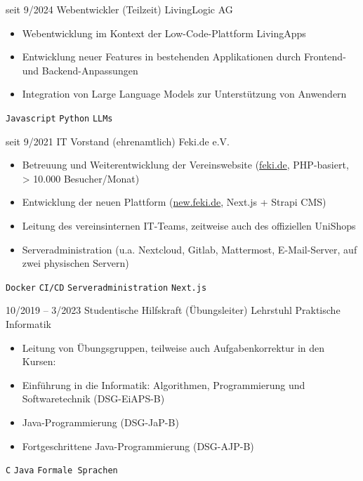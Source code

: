 \documentclass[9pt]{developercv} %
\begin{document}
\begin{entrylist}
	\entry
	{seit 9/2024}
	{Webentwickler (Teilzeit)}
	{LivingLogic AG}
	{\vspace{-10pt}
		\begin{itemize}[noitemsep,topsep=1pt,parsep=1pt,partopsep=0pt, leftmargin=-1pt]
			\item Webentwicklung im Kontext der Low-Code-Plattform LivingApps
			\item Entwicklung neuer Features in bestehenden Applikationen durch Frontend- und Backend-Anpassungen
			\item Integration von Large Language Models zur Unterstützung von Anwendern
		\end{itemize}
		\texttt{Javascript} \slashsep \texttt{Python} \slashsep \texttt{LLMs}}
	\entry
	{seit 9/2021}
	{IT Vorstand (ehrenamtlich)}
	{Feki.de e.V.}
	{\vspace{-10pt}
		\begin{itemize}[noitemsep,topsep=1pt,parsep=1pt,partopsep=0pt, leftmargin=-1pt]
			\item Betreuung und Weiterentwicklung der Vereinswebsite (\href{https://feki.de}{feki.de}, PHP-basiert, > 10.000 Besucher/Monat)
			\item Entwicklung der neuen Plattform (\href{https://new.feki.de}{new.feki.de}, Next.js + Strapi CMS)
			\item Leitung des vereinsinternen IT-Teams, zeitweise auch des offiziellen UniShops
			\item Serveradministration (u.a. Nextcloud, Gitlab, Mattermost, E-Mail-Server, auf zwei physischen Servern)
		\end{itemize}
		\texttt{Docker} \slashsep \texttt{CI/CD} \slashsep \texttt{Serveradministration} \slashsep \texttt{Next.js}}
	\entry
	{10/2019 -- 3/2023}
	{Studentische Hilfskraft (Übungsleiter)}
	{Lehrstuhl Praktische Informatik}
	{\vspace{-10pt}
		\begin{itemize}[noitemsep,topsep=1pt,parsep=1pt,partopsep=0pt, leftmargin=-1pt]
			\item Leitung von Übungsgruppen, teilweise auch Aufgabenkorrektur in den Kursen:
			\item Einführung in die Informatik: Algorithmen, Programmierung und Softwaretechnik (DSG-EiAPS-B)
			\item Java-Programmierung (DSG-JaP-B)
			\item Fortgeschrittene Java-Programmierung (DSG-AJP-B)
		\end{itemize}
		\texttt{C} \slashsep \texttt{Java} \slashsep \texttt{Formale Sprachen}}
\end{entrylist}
\end{document}
